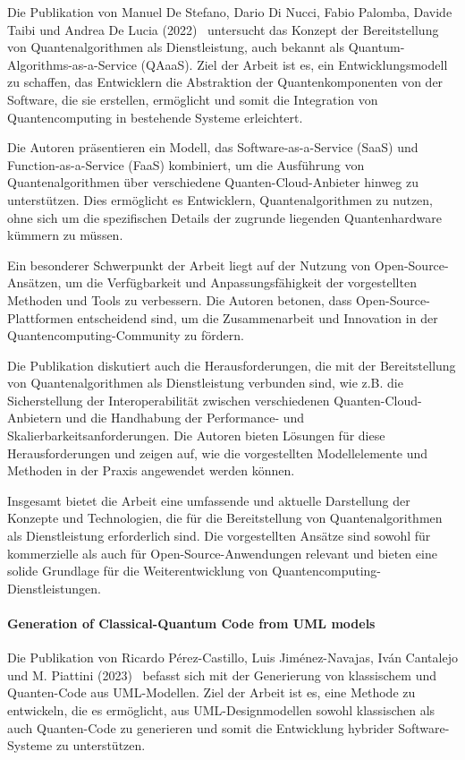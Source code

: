 Die Publikation von Manuel De Stefano, Dario Di Nucci, Fabio Palomba, Davide Taibi und Andrea De Lucia (2022)~\cite{Stefano_2022} untersucht 
das Konzept der Bereitstellung von Quantenalgorithmen als Dienstleistung, auch bekannt als Quantum-Algorithms-as-a-Service (QAaaS). 
Ziel der Arbeit ist es, ein Entwicklungsmodell zu schaffen, das Entwicklern die Abstraktion der Quantenkomponenten von der 
Software, die sie erstellen, ermöglicht und somit die Integration von Quantencomputing in bestehende Systeme erleichtert.

Die Autoren präsentieren ein Modell, das Software-as-a-Service (SaaS) und Function-as-a-Service (FaaS) kombiniert, um 
die Ausführung von Quantenalgorithmen über verschiedene Quanten-Cloud-Anbieter hinweg zu unterstützen. Dies ermöglicht es 
Entwicklern, Quantenalgorithmen zu nutzen, ohne sich um die spezifischen Details der zugrunde liegenden Quantenhardware kümmern zu müssen. 

Ein besonderer Schwerpunkt der Arbeit liegt auf der Nutzung von Open-Source-Ansätzen, um die Verfügbarkeit und 
Anpassungsfähigkeit der vorgestellten Methoden und Tools zu verbessern. Die Autoren betonen, dass Open-Source-Plattformen 
entscheidend sind, um die Zusammenarbeit und Innovation in der Quantencomputing-Community zu fördern.

Die Publikation diskutiert auch die Herausforderungen, die mit der Bereitstellung von Quantenalgorithmen als 
Dienstleistung verbunden sind, wie z.B. die Sicherstellung der Interoperabilität zwischen verschiedenen Quanten-Cloud-Anbietern 
und die Handhabung der Performance- und Skalierbarkeitsanforderungen. Die Autoren bieten Lösungen für diese Herausforderungen 
und zeigen auf, wie die vorgestellten Modellelemente und Methoden in der Praxis angewendet werden können.

Insgesamt bietet die Arbeit eine umfassende und aktuelle Darstellung der Konzepte und Technologien, die für die 
Bereitstellung von Quantenalgorithmen als Dienstleistung erforderlich sind. Die vorgestellten Ansätze sind sowohl 
für kommerzielle als auch für Open-Source-Anwendungen relevant und bieten eine solide Grundlage für die Weiterentwicklung 
von Quantencomputing-Dienstleistungen.

\paragraph{Generation of Classical-Quantum Code from UML models}

Die Publikation von Ricardo Pérez-Castillo, Luis Jiménez-Navajas, Iván Cantalejo und M. Piattini (2023)~\cite{Perez-Castillo_2023} 
befasst sich mit der Generierung von klassischem und Quanten-Code aus UML-Modellen. Ziel der Arbeit ist es, 
eine Methode zu entwickeln, die es ermöglicht, aus UML-Designmodellen sowohl klassischen als auch Quanten-Code 
zu generieren und somit die Entwicklung hybrider Software-Systeme zu unterstützen.


